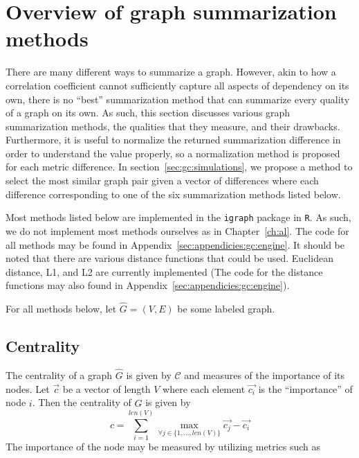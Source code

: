 \section{Overview of graph summarization methods}
\label{sec:gc:methods}

There are many different ways to summarize a graph. However, akin to how a
correlation coefficient cannot sufficiently capture all aspects of dependency 
on its own, there is no ``best'' summarization method that can summarize 
every quality of a graph on its own. As such, this section discusses various 
graph summarization methods, the qualities that they measure, and their 
drawbacks. Furthermore, it is useful to normalize the returned 
summarization difference in order to understand the value properly, so a 
normalization method is proposed for each metric difference. 
In section~\ref{sec:gc:simulations}, we propose a method to select the most 
similar graph pair given a vector of differences where each difference 
corresponding to one of the six summarization methods listed below.

Most methods listed below are implemented in the \texttt{igraph} package in 
\texttt{R}. As such, we do not implement most methods ourselves as in 
Chapter~\ref{ch:al}. The code for 
all methods may be found in Appendix~\ref{sec:appendicies:gc:engine}. It should 
be noted that there are various distance functions that could be used. 
Euclidean distance, L1, and L2 are currently implemented (The code for the 
distance functions may also found in Appendix~\ref{sec:appendicies:gc:engine}). 

For all methods below, let $\hat{G}=(V,E)$ be some labeled graph.

\subsection{Centrality}

The centrality of a graph $\hat{G}$ is given by $\mathcal{C}$ and measures 
of the importance of its 
nodes. Let $\overrightarrow{c}$ be a vector of length $V$ where each element 
$\overrightarrow{c_i}$ is the ``importance'' of node $i$. Then the centrality 
of $\hat{G}$ is given by
$$c = \sum\limits^{len(V)}_{i=1} \max_{\forall j \in \{1,...,len(V)\}} 
\overrightarrow{c_j} - \overrightarrow{c_i}$$
The importance of the node may be measured by utilizing metrics such as 

